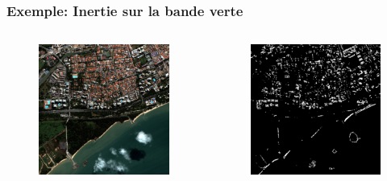 \documentclass[compress,handout]{beamer}
\begin{document}
\begin{frame}
\frametitle{Exemple: Inertie sur la bande verte}
\begin{columns}
\begin{column}{0.5\textwidth}
\begin{figure}[]
  \includegraphics[width=1.0\textwidth]{radio2-extract-3b.jpg}
\end{figure}
\end{column}
\begin{column}{0.5\textwidth}
\begin{figure}[]
  \includegraphics[width=1.0\textwidth]{Texture-Inertia-R2-2-O1-1-C1.jpg}
\end{figure}
\end{column}
\end{columns}
\end{frame}
\end{document}
